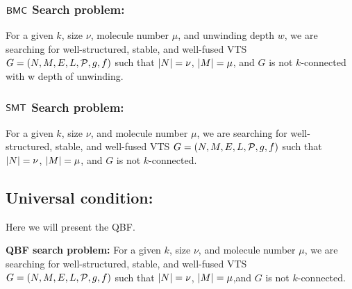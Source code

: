 \subsubsection{$\mathsf{BMC}$ Search problem:}
For a given $k$, size $\nu$, molecule number $\mu$, and unwinding depth $w$,
we are searching for well-structured, stable, and well-fused VTS
$G = (N,M,E,L,\mathcal{P},g,f)$ such that
$|N| = \nu$, $|M| = \mu$, and $G$ is not $k$-connected with w depth of unwinding.    

\subsubsection{$\mathsf{SMT}$ Search problem:}
For a given $k$, size $\nu$, and molecule number $\mu$,
we are searching for well-structured, stable, and well-fused VTS
$G = (N,M,E,L,\mathcal{P},g,f)$ such that
$|N| = \nu$, $|M| = \mu$, and
$G$ is not $k$-connected.    

%
%
%
%

\subsection{Universal condition:}
Here we will present the QBF.

 \textbf{QBF search problem:}
For a given $k$, size $\nu$, and molecule number $\mu$,
we are searching for well-structured, stable, and well-fused VTS
$G = (N,M,E,L,\mathcal{P},g,f)$ such that
$|N| = \nu$, $|M| = \mu$,and
$G$ is not $k$-connected.    

